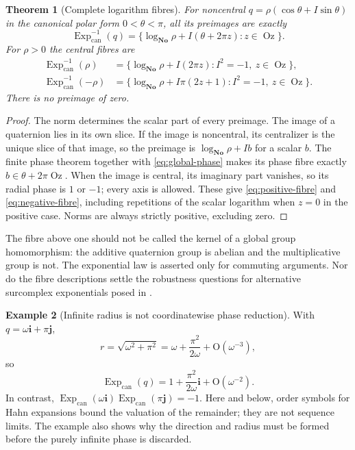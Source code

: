 \documentclass[11pt,letterpaper]{article}
\newtheorem{theorem}{Theorem}[section]
\theoremstyle{definition}
\newtheorem{example}[theorem]{Example}
\newcommand{\No}{\mathbf{No}}
\newcommand{\ii}{\mathbf i}
\newcommand{\jj}{\mathbf j}
\DeclareMathOperator{\Oz}{Oz}
\newcommand{\ExpC}{\operatorname{Exp}_{\mathrm{can}}}
\newcommand{\bigO}{\mathrm{O}}
\begin{document}
\begin{theorem}[Complete logarithm fibres]
\label{thm:logfibres}
For noncentral $q=\rho(\cos\theta+I\sin\theta)$ in the canonical polar form
$0<\theta<\pi$, all its preimages are exactly
\begin{equation}
 \ExpC^{-1}(q)=
 \{\log_{\No}\rho+I(\theta+2\pi z):z\in\Oz\}.
 \label{eq:logfibre-nonreal}
\end{equation}
For $\rho>0$ the central fibres are
\begin{align}
 \ExpC^{-1}(\rho)&=
 \{\log_{\No}\rho+I(2\pi z):I^2=-1,\ z\in\Oz\},\label{eq:positive-fibre}\\
 \ExpC^{-1}(-\rho)&=
 \{\log_{\No}\rho+I\pi(2z+1):I^2=-1,\ z\in\Oz\}.
 \label{eq:negative-fibre}
\end{align}
There is no preimage of zero.
\end{theorem}
\begin{proof}
The norm determines the scalar part of every preimage. The image of a
quaternion lies in its own slice. If the image is noncentral, its centralizer
is the unique slice of that image, so the preimage is
$\log_{\No}\rho+Ib$ for a scalar $b$. The finite phase theorem together with
\eqref{eq:global-phase} makes its phase fibre exactly
$b\in\theta+2\pi\Oz$. When the image is central, its imaginary part vanishes,
so its radial phase is $1$ or $-1$; every axis is allowed. These give
\eqref{eq:positive-fibre} and \eqref{eq:negative-fibre}, including repetitions
of the scalar logarithm when $z=0$ in the positive case. Norms are always
strictly positive, excluding zero.
\end{proof}
The fibre above one should not be called the kernel of a global group
homomorphism: the additive quaternion group is abelian and the multiplicative
group is not. The exponential law is asserted only for commuting arguments.
Nor do the fibre descriptions settle the robustness questions for alternative
surcomplex exponentials posed in \cite{ek}.

\begin{example}[Infinite radius is not coordinatewise phase reduction]
With $q=\omega\ii+\pi\jj$,
\[
 r=\sqrt{\omega^2+\pi^2}
   =\omega+\frac{\pi^2}{2\omega}+\bigO(\omega^{-3}),
\]
so
\[
 \ExpC(q)=1+\frac{\pi^2}{2\omega}\ii+\bigO(\omega^{-2}).
\]
In contrast, $\ExpC(\omega\ii)\ExpC(\pi\jj)=-1$. Here and below, order symbols
for Hahn expansions bound the valuation of the remainder; they are not
sequence limits. The example also shows why the direction and radius must be
formed before the purely infinite phase is discarded.
\end{example}
\end{document}
